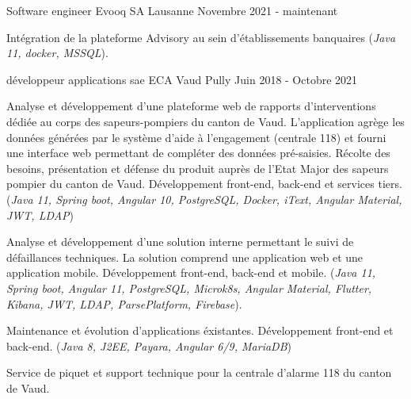 


\begin{cventries}

\cventry
{Software engineer} %
{Evooq SA} %
{Lausanne} %
{Novembre 2021 - maintenant} %
{ %
\begin{cvitems}
\item {Intégration de la plateforme Advisory au sein d'établissements banquaires (\emph{Java 11, docker, MSSQL}).}
\end{cvitems}
}


\cventry
{développeur applications sae} %
{ECA Vaud} %
{Pully} %
{Juin 2018 - Octobre 2021} %
{ %
\begin{cvitems}
\item {Analyse et développement d'une plateforme web de rapports d'interventions dédiée au corps des sapeurs-pompiers du canton de Vaud.
L'application agrège les données générées par le système d'aide à l'engagement (centrale 118) et fourni une interface web permettant de compléter des données pré-saisies.
Récolte des besoins, présentation et défense du produit auprès de l'Etat Major des sapeurs pompier du canton de Vaud. Développement front-end, back-end et services tiers.
(\emph{Java 11, Spring boot, Angular 10, PostgreSQL, Docker, iText, Angular Material, JWT, LDAP})}
\item {Analyse et développement d'une solution interne permettant le suivi de défaillances techniques. La solution comprend une application web et une application mobile. Développement front-end, back-end et mobile. (\emph{Java 11, Spring boot, Angular 11, PostgreSQL, Microk8s, Angular Material, Flutter, Kibana, JWT, LDAP, ParsePlatform, Firebase}).}
\item {Maintenance et évolution d'applications éxistantes. Développement front-end et back-end. (\emph{Java 8, J2EE, Payara, Angular 6/9, MariaDB})}
\item {Service de piquet et support technique pour la centrale d'alarme 118 du canton de Vaud.}
\end{cvitems}
}


\end{cventries}
